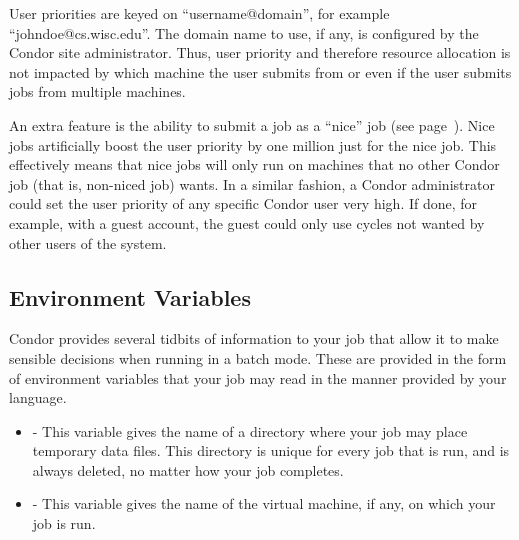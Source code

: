 User priorities are keyed on ``username@domain'', for example
``johndoe@cs.wisc.edu''. The domain name to use, if any, is configured by
the Condor site administrator.  Thus, user priority and therefore resource
allocation is not impacted by which machine the user submits from or
even if the user submits jobs from multiple machines.

An extra feature is the ability to submit a job as
a ``nice'' job (see page~\pageref{man-condor-submit-nice}).
Nice jobs artificially boost the user priority 
by one million just for the nice job.
This effectively means that nice jobs will only run on
machines that no other Condor job (that is, non-niced job) wants.
In a similar fashion, a Condor administrator could set
the user priority of any specific Condor user very high.
If done, for example, with a guest account,
the guest could only use cycles not wanted by other users of the system.

\subsection{Environment Variables}

Condor provides several tidbits of information to your job that
allow it to make sensible decisions when running in a batch mode.
These are provided in the form of environment variables that your
job may read in the manner provided by your language.

\begin{itemize}
\item {}  - This variable gives the name of a directory
where your job may place temporary data files.  This directory is unique for
every job that is run, and is always deleted, no matter how your job completes.
\item {}  - This variable gives the name of the virtual machine,
if any, on which your job is run.
\end{itemize}





